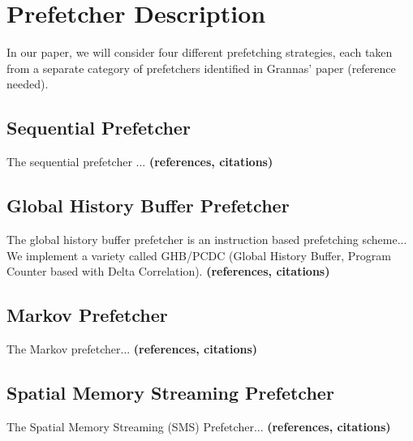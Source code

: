 
\section{Prefetcher Description}
\label{sec:prefetcherDescription}

In our paper, we will consider four different prefetching strategies,
each taken from a separate category of prefetchers identified in
Grannas' paper (reference needed).

\subsection{Sequential Prefetcher}
\label{sec:sequentialPrefetcher}
The sequential prefetcher ... 
{\bf (references, citations)}

\subsection{Global History Buffer Prefetcher}
\label{sec:ghbPcdcPrefetcher}
The global history buffer prefetcher is an instruction based
prefetching scheme... We implement a variety called GHB/PCDC (Global
History Buffer, Program Counter based with Delta Correlation).
{\bf (references, citations)}

\subsection{Markov Prefetcher}
\label{sec:markovPrefetcher}
The Markov prefetcher...
{\bf (references, citations)}

\subsection{Spatial Memory Streaming Prefetcher}
\label{sec:smsPrefetcher}
The Spatial Memory Streaming (SMS) Prefetcher...
{\bf (references, citations)}
